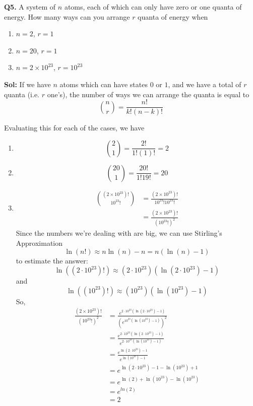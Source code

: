 \documentclass[twoside]{article}
\begin{document}
\textbf{Q5.} A system of $n$ atoms, each of which can only have zero or one quanta of energy. How many ways can you arrange $r$ quanta of energy when
\begin{enumerate}[label=(\alph*)]
   \item $n = 2$, $r = 1$
   \item $n = 20$, $r = 1$
   \item $n = 2 \times 10^{23}$, $r = 10^{23}$
\end{enumerate}

\textbf{Sol:} If we have $n$ atoms which can have states $0$ or $1$, and we have a total of $r$ quanta (i.e. $r$ one's), the number of ways we can arrange the quanta is equal to 
\[ \binom{n}{r} = \frac{n!}{k!(n-k)!} \]

Evaluating this for each of the cases, we have 
\begin{enumerate}[label = (\alph*)]
   \item \[ \binom{2}{1} = \frac{2!}{1!(1)!} = \boxed{2} \]
   
   \item \[ \binom{20}{1} = \frac{20!}{1!19!} = \boxed{20} \]
   
   \item
   \begin{align*}
      \binom{(2\times 10^{23})!}{10^{23}!} &= \frac{(2\times 10^{23})!}{10^{23}!10^{23}!} \\
                                           &= \frac{(2 \times 10^{23})!}{(10^{23}!)^2} 
   \end{align*}
   Since the numbers we're dealing with are big, we can use Stirling's Approximation
   \[ \ln(n!) \approx n\ln(n) - n = n(\ln(n) - 1) \]
   to estimate the answer:
   \[ \ln((2\cdot10^{23})!) \approx (2\cdot10^{23})\left( \ln(2\cdot10^{23}) - 1 \right) \]
   and 
   \[ \ln((10^{23})!) \approx (10^{23})\left( \ln(10^{23}) - 1 \right) \]
   So,
   \begin{align*}
      \frac{(2 \times 10^{23})!}{(10^{23}!)^2} &= \frac{e^{2\cdot 10^{23}(\ln(2\cdot 10^{23})-1)}}{(e^{10^{23}(\ln(10^{23})-1)})^2} \\
                                               &= \frac{e^{2\cdot 10^{23}(\ln(2\cdot 10^{23})-1)}}{e^{2\cdot10^{23}(\ln(10^{23})-1)}} \\
                                               &= \frac{e^{\ln(2\cdot 10^{23})-1}}{e^{\ln(10^{23})-1}} \\
                                               &= e^{\ln(2\cdot10^{23}) - 1 - \ln(10^{23}) + 1} \\
                                               &= e^{\ln(2)+\ln(10^{23})-\ln(10^{23})} \\
                                               &= e^{ln(2)} \\
                                               &= \boxed{2}
   \end{align*}

\end{enumerate}
\end{document}
